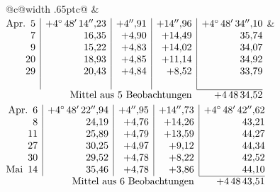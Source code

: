 \noindent\begin{tabular}{@{}c@{\hspace{.4em}\vrule width .65pt\hspace{.4em}}c@{}}
 &
 \\[.18ex]
\(\begin{array}[t]{@{}r|r|r|r|r@{}}
\text{Apr.}\enspace 5 & +4^\circ\,48'\,14''{,}23 & +4''{,}91 & +14''{,}96 & +4^\circ\,48'\,34''{,}10\\
7 & 16{,}35 & +4{,}90 & +14{,}49 & 35{,}74\\
9 & 15{,}22 & +4{,}83 & +14{,}02 & 34{,}07\\
20 & 18{,}93 & +4{,}85 & +11{,}14 & 34{,}92\\
29 & 20{,}43 & +4{,}84 & +8{,}52 & 33{,}79\\
 & & & & \\
\cline{5-5}
\multicolumn{4}{r}{\text{Mittel aus 5 Beobachtungen}} & +4\,48\,34{,}52
\end{array}\)
&
\(\begin{array}[t]{@{}r|r|r|r|r@{}}
\text{Apr.}\enspace 6 & +4^\circ\,48'\,22''{,}94 & +4''{,}95 & +14''{,}73 & +4^\circ\,48'\,42''{,}62\\
8 & 24{,}19 & +4{,}76 & +14{,}26 & 43{,}21\\
11 & 25{,}89 & +4{,}79 & +13{,}59 & 44{,}27\\
27 & 30{,}25 & +4{,}97 & +9{,}12 & 44{,}34\\
30 & 29{,}52 & +4{,}78 & +8{,}22 & 42{,}52\\
\text{Mai}\enspace 14 & 35{,}46 & +4{,}78 & +3{,}86 & 44{,}10\\
\cline{5-5}
\multicolumn{4}{r}{\text{Mittel aus 6 Beobachtungen}} & +4\,48\,43{,}51
\end{array}\)
\end{tabular}\par\medskip

\par\clearpage
\noindent\makebox[12mm][l]{}\par\medskip

